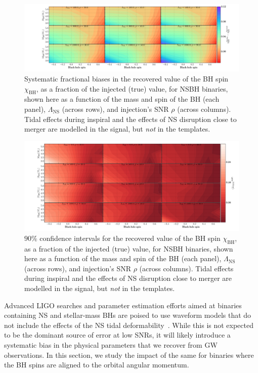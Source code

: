 \documentclass[aps,prd,amsmath,floats,floatfix, twocolumn,
superscriptaddress,nofootinbib,showpacs]{revtex4-1}
\newcommand{\lambdans}{\Lambda_\mathrm{NS}}
\newcommand{\chibh}{\chi_\mathrm{BH}}
\begin{document}
\begin{figure}
\centering
\includegraphics[trim={{0.4\columnwidth} 0 0 0},width=2.2\columnwidth]{plots-TN/TN_ChiBHBiases_CI90_0_Lambda_SNR.pdf}
\caption{Systematic fractional biases in the recovered value of the BH spin $\chibh$,
as a fraction of the injected (true) value, for NSBH binaries, shown here as a
function of the mass and spin of the BH (each panel), $\lambdans$ (across 
rows), and injection's SNR $\rho$ (across columns). Tidal effects during
inspiral and the effects of NS disruption close to merger are modelled in the
signal, but \textit{not} in the templates. }
\label{fig:TNT_BHspinBias_vs_SNR_q23}
\end{figure}
% 
\begin{figure}
\centering    
\includegraphics[trim={{0.4\columnwidth} 0 0 0},width=2.2\columnwidth]{plots-TN/TN_ChiBHCIWidths90_0_Lambda_SNR.pdf}
\caption{$90\%$ confidence intervals for the recovered value of the BH spin $\chibh$,
as a fraction of the injected (true) value, for NSBH binaries, shown here as a 
function of the mass and spin of the BH (each panel), $\lambdans$ (across 
rows), and injection's SNR $\rho$ (across columns). Tidal effects during
inspiral and the effects of NS disruption close to merger are modelled in the
signal, but \textit{not} in the templates.}
\label{fig:TNT_BHspinCIWidth90_vs_SNR_q23}
\end{figure}
% 
% 
Advanced LIGO searches and parameter estimation efforts aimed at binaries 
containing NS and stellar-mass BHs are poised to use waveform models that do not
include the effects of the NS tidal deformability~\cite{Canton:2014ena}.
While this is not expected to
be the dominant source of error at low SNRs, it will likely introduce a
systematic bias in the physical parameters that we recover from GW observations.
In this section, we study the impact of the same for binaries where the BH spins
are aligned to the orbital angular momentum.
\end{document}
